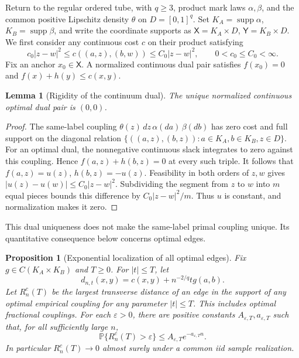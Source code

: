 \documentclass[11pt,reqno]{amsart}
\newtheorem{lemma}[theorem]{Lemma}
\newtheorem{proposition}[theorem]{Proposition}
\theoremstyle{definition}
\theoremstyle{remark}
\numberwithin{equation}{section}
\newcommand{\Pp}{\mathbb P}
\begin{document}
Return to the regular ordered tube, with \(q\ge3\), product
mark laws \(\alpha,\beta\), and the common positive Lipschitz
density \(\theta\) on \(D=[0,1]^q\). Set
\(K_A=\operatorname{supp}\alpha\),
\(K_B=\operatorname{supp}\beta\), and write the coordinate
supports as \(\mathsf X=K_A\times D\),
\(\mathsf Y=K_B\times D\). We first consider any continuous
cost \(c\) on their product satisfying
\begin{equation}
c_0|z-w|^2\le c((a,z),(b,w))\le C_0|z-w|^2,
\qquad 0<c_0\le C_0<\infty.
\label{eq:highd-dual-cost}
\end{equation}
Fix an anchor \(x_0\in\mathsf X\). A normalized continuous
dual pair satisfies \(f(x_0)=0\) and \(f(x)+h(y)\le c(x,y)\).

\begin{lemma}[Rigidity of the continuum dual]
\label{lem:highd-dual-rigidity}
The unique normalized continuous optimal dual pair is \((0,0)\).
\end{lemma}

\begin{proof}
The same-label coupling
\(\theta(z)\,dz\,\alpha(da)\,\beta(db)\) has zero cost and
full support on the diagonal relation
\(\{((a,z),(b,z)):a\in K_A,b\in K_B,z\in D\}\).
For an optimal dual, the nonnegative continuous slack integrates
to zero against this coupling. Hence
\(f(a,z)+h(b,z)=0\) at every such triple. It follows that
\(f(a,z)=u(z)\), \(h(b,z)=-u(z)\). Feasibility in both
orders of \(z,w\) gives
\(|u(z)-u(w)|\le C_0|z-w|^2\).
Subdividing the segment from \(z\) to \(w\) into \(m\)
equal pieces bounds this difference by \(C_0|z-w|^2/m\).
Thus \(u\) is constant, and normalization makes it zero.
\end{proof}

This dual uniqueness does not make the same-label primal coupling
unique. Its quantitative consequence below concerns optimal edges.

\begin{proposition}[Exponential localization of all optimal edges]
\label{prop:highd-exponential-localization}
Fix \(g\in C(K_A\times K_B)\) and \(T\ge0\). For
\(|t|\le T\), let
\[
d_{n,t}(x,y)=c(x,y)+n^{-2/q}t g(a,b).
\]
Let \(R_n^c(T)\) be the largest transverse distance of an edge
in the support of any optimal empirical coupling for any parameter
\(|t|\le T\). This includes optimal fractional couplings.
For each \(\varepsilon>0\), there are positive constants
\(A_{\varepsilon,T},a_{\varepsilon,T}\) such that, for all
sufficiently large \(n\),
\[
\Pp\{R_n^c(T)>\varepsilon\}
 \le A_{\varepsilon,T}e^{-a_{\varepsilon,T}n}.
\]
In particular \(R_n^c(T)\to0\) almost surely under a common
iid sample realization.
\end{proposition}
\end{document}
